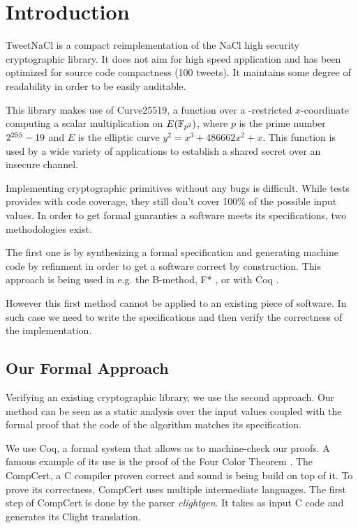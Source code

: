\section{Introduction}

TweetNaCl\cite{BGJ+15} is a compact reimplementation of the
NaCl\cite{BLS12} high security cryptographic library.
It does not aim for high speed application and has been optimized for source
code compactness (100 tweets). It maintains some degree of readability in order
to be easily auditable.

This library makes use of Curve25519\cite{Ber06}, a function over a -restricted
$x$-coordinate computing a scalar multiplication on $E(\mathbb{F}_{p^2})$, where $p$ is
the prime number $2^{255}-19$ and $E$ is the elliptic curve $y^2 = x^3 + 486662 x^2 + x$.
This function is used by a wide variety of applications\cite{this-that-use-curve25519}
to establish a shared secret over an insecure channel.

Implementing cryptographic primitives without any bugs is difficult.
While tests provides with code coverage, they still don't cover 100\% of the
possible input values. In order to get formal guaranties a software meets its
specifications, two methodologies exist.

The first one is by synthesizing a formal specification and generating machine
code by refinment in order to get a software correct by construction.
This approach is being used in e.g. the B-method\cite{Abrial:1996:BAP:236705},
F* \cite{DBLP:journals/corr/BhargavanDFHPRR17}, or with Coq \cite{CpdtJFR}.

However this first method cannot be applied to an existing piece of software.
In such case we need to write the specifications and then verify the correctness
of the implementation.

\subsection{Our Formal Approach}

Verifying an existing cryptographic library, we use the second approach.
Our method can be seen as a static analysis over the input values coupled
with the formal proof that the code of the algorithm matches its specification.

We use Coq\cite{coq-faq}, a formal system that allows us to machine-check our proofs.
A famous example of its use is the proof of the Four Color Theorem \cite{gonthier2008formal}.
The CompCert, a C compiler\cite{Leroy-backend} proven correct and sound is being build on top of it.
To prove its correctness, CompCert uses multiple intermediate languages. The first step of CompCert is done by the parser \textit{clightgen}.
It takes as input C code and generates its Clight\cite{Blazy-Leroy-Clight-09} translation.

